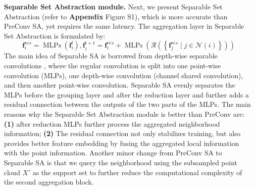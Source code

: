 \documentclass{article}
\newcommand{\mysection}[1]{\vspace{3pt}\noindent\textbf{#1.}}
\newcommand{\supp}{\textbf{Appendix}\xspace}
\begin{document}
\mysection{Separable Set Abstraction module}
Next, we present Separable Set Abstraction (refer to \supp Figure  S1), which is more accurate than PreConv SA, yet requires the same latency. The aggregation layer in Separable Set Abstraction is formulated by: 
\begin{equation}
    \mathbf{f}_{i}^{res}=\operatorname{MLPs}\left(\mathbf{f}_{i}^{l}\right), \mathbf{f}_{i}^{l+1}=\mathbf{f}_{i}^{res} + \operatorname{MLPs}\left(\mathcal{R}\left(\left\{\mathbf{f}_{j}^{res} \mid j \in \mathcal{N}(i)\right\}\right)\right)
\end{equation}
The main idea of Separable SA is borrowed from depth-wise separable convolutions \cite{Howard2017MobileNetsEC}, where the regular convolution is split into one point-wise convolution (MLPs), one depth-wise convolution (channel shared convolution), and then another point-wise convolution. Separable SA evenly separates the MLPs before the grouping layer and after the reduction layer and further adds a residual connection between the outputs of the two parts of the MLPs. The main reasons why the Separable Set Abstraction module is better than PreConv are: \textbf{(1)} after reduction MLPs further process the aggregated neighborhood information; \textbf{(2)} The residual connection not only stabilizes training, but also provides better feature embedding by fusing the aggregated local information with the point information. Another minor change from PreConv SA to Separable SA is that we query the neighborhood using the subsampled point cloud $X'$ as the support set to further reduce the computational complexity of the second aggregation block. 
\end{document}

